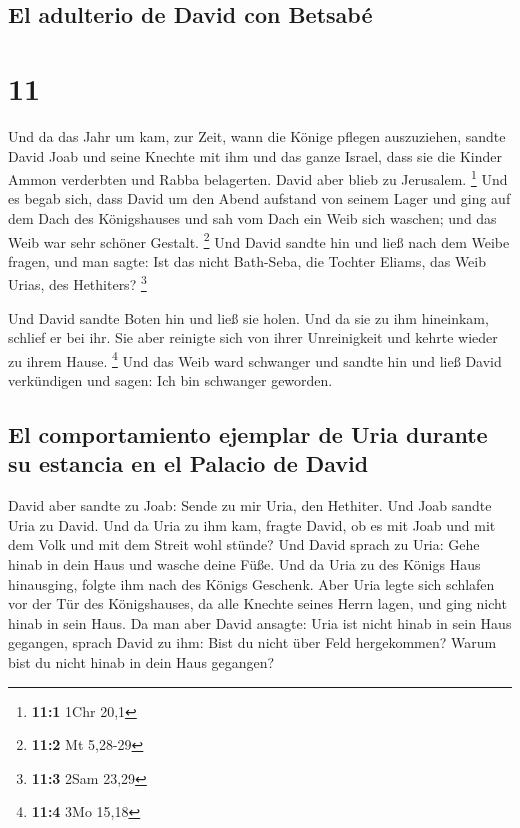 \hypertarget{el-adulterio-de-david-con-betsabuxe9}{%
\subsection{El adulterio de David con
Betsabé}\label{el-adulterio-de-david-con-betsabuxe9}}

\hypertarget{section-10}{%
\section{11}\label{section-10}}

 Und da das Jahr um kam, zur Zeit, wann die Könige pflegen
auszuziehen, sandte David Joab und seine Knechte mit ihm und das ganze
Israel, dass sie die Kinder Ammon verderbten und Rabba belagerten. David
aber blieb zu Jerusalem. \footnote{\textbf{11:1} 1Chr 20,1}
 Und es begab sich, dass David um den Abend aufstand von
seinem Lager und ging auf dem Dach des Königshauses und sah vom Dach ein
Weib sich waschen; und das Weib war sehr schöner Gestalt. \footnote{\textbf{11:2}
  Mt 5,28-29}  Und David sandte hin und ließ nach dem
Weibe fragen, und man sagte: Ist das nicht Bath-Seba, die Tochter
Eliams, das Weib Urias, des Hethiters? \footnote{\textbf{11:3} 2Sam
  23,29}

 Und David sandte Boten hin und ließ sie holen. Und da sie
zu ihm hineinkam, schlief er bei ihr. Sie aber reinigte sich von ihrer
Unreinigkeit und kehrte wieder zu ihrem Hause. \footnote{\textbf{11:4}
  3Mo 15,18}  Und das Weib ward schwanger und sandte hin
und ließ David verkündigen und sagen: Ich bin schwanger geworden.

\hypertarget{el-comportamiento-ejemplar-de-uria-durante-su-estancia-en-el-palacio-de-david}{%
\subsection{El comportamiento ejemplar de Uria durante su estancia en el
Palacio de
David}\label{el-comportamiento-ejemplar-de-uria-durante-su-estancia-en-el-palacio-de-david}}

 David aber sandte zu Joab: Sende zu mir Uria, den
Hethiter. Und Joab sandte Uria zu David.  Und da Uria zu
ihm kam, fragte David, ob es mit Joab und mit dem Volk und mit dem
Streit wohl stünde?  Und David sprach zu Uria: Gehe hinab
in dein Haus und wasche deine Füße. Und da Uria zu des Königs Haus
hinausging, folgte ihm nach des Königs Geschenk.  Aber
Uria legte sich schlafen vor der Tür des Königshauses, da alle Knechte
seines Herrn lagen, und ging nicht hinab in sein Haus. 
Da man aber David ansagte: Uria ist nicht hinab in sein Haus gegangen,
sprach David zu ihm: Bist du nicht über Feld hergekommen? Warum bist du
nicht hinab in dein Haus gegangen?

